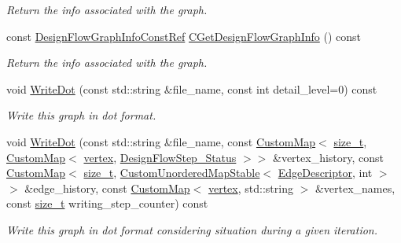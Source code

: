 \begin{DoxyCompactItemize}
\begin{DoxyCompactList}\small\item\em Return the info associated with the graph. \end{DoxyCompactList}\item 
const \hyperlink{design__flow__graph_8hpp_a85b5e7eb34f1a41b5acbd96cf370cc16}{Design\+Flow\+Graph\+Info\+Const\+Ref} \hyperlink{classDesignFlowGraph_a1f75898d82ee634a63c9be38196dabb4}{C\+Get\+Design\+Flow\+Graph\+Info} () const
\begin{DoxyCompactList}\small\item\em Return the info associated with the graph. \end{DoxyCompactList}\item 
void \hyperlink{classDesignFlowGraph_a41d86542c0c25d99e0c3f0bcd511859b}{Write\+Dot} (const std\+::string \&file\+\_\+name, const int detail\+\_\+level=0) const
\begin{DoxyCompactList}\small\item\em Write this graph in dot format. \end{DoxyCompactList}\item 
void \hyperlink{classDesignFlowGraph_a9aae504eb1e2cf74566de6dc3fc8044b}{Write\+Dot} (const std\+::string \&file\+\_\+name, const \hyperlink{custom__map_8hpp_a18ca01763abbe3e5623223bfe5aaac6b}{Custom\+Map}$<$ \hyperlink{tutorial__fpt__2017_2intro_2sixth_2test_8c_a7c94ea6f8948649f8d181ae55911eeaf}{size\+\_\+t}, \hyperlink{custom__map_8hpp_a18ca01763abbe3e5623223bfe5aaac6b}{Custom\+Map}$<$ \hyperlink{graph_8hpp_abefdcf0544e601805af44eca032cca14}{vertex}, \hyperlink{design__flow__step_8hpp_afb1f0d73069c26076b8d31dbc8ebecdf}{Design\+Flow\+Step\+\_\+\+Status} $>$$>$ \&vertex\+\_\+history, const \hyperlink{custom__map_8hpp_a18ca01763abbe3e5623223bfe5aaac6b}{Custom\+Map}$<$ \hyperlink{tutorial__fpt__2017_2intro_2sixth_2test_8c_a7c94ea6f8948649f8d181ae55911eeaf}{size\+\_\+t}, \hyperlink{custom__map_8hpp_a7314a7df1cdb3a3acf478ab86e95c226}{Custom\+Unordered\+Map\+Stable}$<$ \hyperlink{graph_8hpp_a9eb9afea34e09f484b21f2efd263dd48}{Edge\+Descriptor}, int $>$$>$ \&edge\+\_\+history, const \hyperlink{custom__map_8hpp_a18ca01763abbe3e5623223bfe5aaac6b}{Custom\+Map}$<$ \hyperlink{graph_8hpp_abefdcf0544e601805af44eca032cca14}{vertex}, std\+::string $>$ \&vertex\+\_\+names, const \hyperlink{tutorial__fpt__2017_2intro_2sixth_2test_8c_a7c94ea6f8948649f8d181ae55911eeaf}{size\+\_\+t} writing\+\_\+step\+\_\+counter) const
\begin{DoxyCompactList}\small\item\em Write this graph in dot format considering situation during a given iteration. \end{DoxyCompactList}\end{DoxyCompactItemize}
